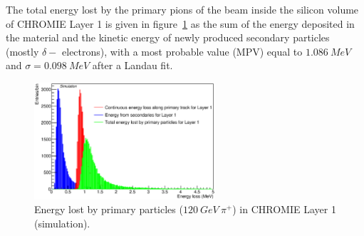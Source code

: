 \documentclass[a4paper,11pt]{article}
\begin{document}
The total energy lost by the primary pions of the beam inside the silicon volume of CHROMIE Layer 1 is given in figure~\ref{fig:4} as the sum of the energy deposited in the material and the kinetic energy of newly produced secondary particles (mostly $\delta -$ electrons), with a most probable value (MPV) equal to $1.086\: MeV$ and $\sigma = 0.098\: MeV$ after a Landau fit.


\begin{figure}[htbp]
	\centering %
	\includegraphics[width=0.6\textwidth,origin=c,angle=0]{energy_layer_1.eps}
	\caption{\label{fig:4} Energy lost by primary particles ($120\: GeV\: \pi^{+}$) in CHROMIE Layer 1 (simulation).}
\end{figure}

\end{document}
